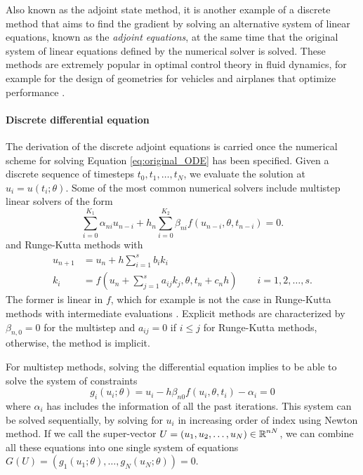 Also known as the adjoint state method, it is another example of a discrete method that aims to find the gradient by solving an alternative system of linear equations, known as the \textit{adjoint equations}, at the same time that the original system of linear equations defined by the numerical solver is solved. 
These methods are extremely popular in optimal control theory in fluid dynamics, for example for the design of geometries for vehicles and airplanes that optimize performance \cite{Elliott_Peraire_1996, Giles_Pierce_2000}.


\paragraph{Discrete differential equation}


The derivation of the discrete adjoint equations is carried once the numerical scheme for solving Equation \eqref{eq:original_ODE} has been specified.  
Given a discrete sequence of timesteps $t_0, t_1, \ldots, t_N$, we evaluate the solution at $u_i = u(t_i; \theta)$. 
Some of the most common numerical solvers include multistep linear solvers of the form 
\begin{equation}
    \sum_{i=0}^{K_1} \alpha_{ni} u_{n-i} 
    +
    h_n \sum_{i=0}^{K_2} \beta_{ni} f(u_{n-i}, \theta, t_{n-i})
    = 
    0.
\end{equation}
and Runge-Kutta methods with 
\begin{align}
    u_{n+1} 
    &= 
    u_n 
    + 
    h \sum_{i=1}^s b_i k_i \\
    k_i 
    &= 
    f \left(u_n + \sum_{j=1}^s a_{ij} k_j , \theta ,  t_n + c_n h \right) \qquad i=1,2, \ldots, s.
\end{align}
The former is linear in $f$, which for example is not the case in Runge-Kutta methods with intermediate evaluations \cite{ascher2008numerical}.
Explicit methods are characterized by $\beta_{n, 0} = 0$ for the multistep and $a_{ij}=0$ if $i \leq j$ for Runge-Kutta methods, otherwise, the method is implicit. 

For multistep methods, solving the differential equation implies to be able to solve the system of constraints
\begin{equation}
    g_i(u_i; \theta) = u_i - h \beta_{n0} f(u_i, \theta, t_i) - \alpha_i = 0
\end{equation}
where $\alpha_i$ has includes the information of all the past iterations. 
This system can be solved sequentially, by solving for $u_i$ in increasing order of index using Newton method. 
If we call the super-vector $U = (u_1, u_2, \ldots, u_N) \in \operatorname{\mathbb{R}}^{nN}$, we can combine all these equations into one single system of equations $G(U) = (g_1(u_1; \theta), \ldots, g_N(u_N; \theta)) = 0$.

